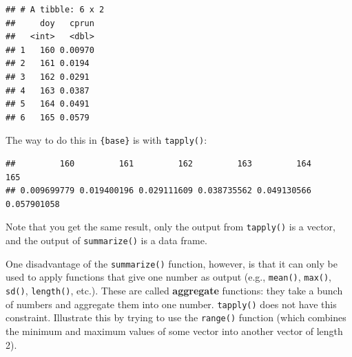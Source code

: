\documentclass[]{book}
\newenvironment{Shaded}{\begin{snugshade}}{\end{snugshade}}
\newcommand{\KeywordTok}[1]{\textcolor[rgb]{0.13,0.29,0.53}{\textbf{#1}}}
\newcommand{\DataTypeTok}[1]{\textcolor[rgb]{0.13,0.29,0.53}{#1}}
\newcommand{\DecValTok}[1]{\textcolor[rgb]{0.00,0.00,0.81}{#1}}
\newcommand{\StringTok}[1]{\textcolor[rgb]{0.31,0.60,0.02}{#1}}
\newcommand{\CommentTok}[1]{\textcolor[rgb]{0.56,0.35,0.01}{\textit{#1}}}
\newcommand{\OperatorTok}[1]{\textcolor[rgb]{0.81,0.36,0.00}{\textbf{#1}}}
\newcommand{\NormalTok}[1]{#1}
\theoremstyle{definition}
\theoremstyle{definition}
\theoremstyle{definition}
\theoremstyle{remark}
\begin{document}
\begin{Shaded}
\end{Shaded}

\begin{verbatim}
## # A tibble: 6 x 2
##     doy   cprun
##   <int>   <dbl>
## 1   160 0.00970
## 2   161 0.0194 
## 3   162 0.0291 
## 4   163 0.0387 
## 5   164 0.0491 
## 6   165 0.0579
\end{verbatim}

The way to do this in \texttt{\{base\}} is with \texttt{tapply()}:

\begin{Shaded}
\end{Shaded}

\begin{verbatim}
##         160         161         162         163         164         165 
## 0.009699779 0.019400196 0.029111609 0.038735562 0.049130566 0.057901058
\end{verbatim}

Note that you get the same result, only the output from
\texttt{tapply()} is a vector, and the output of \texttt{summarize()} is
a data frame.

One disadvantage of the \texttt{summarize()} function, however, is that
it can only be used to apply functions that give one number as output
(e.g., \texttt{mean()}, \texttt{max()}, \texttt{sd()},
\texttt{length()}, etc.). These are called \textbf{aggregate} functions:
they take a bunch of numbers and aggregate them into one number.
\texttt{tapply()} does not have this constraint. Illustrate this by
trying to use the \texttt{range()} function (which combines the minimum
and maximum values of some vector into another vector of length 2).

\begin{Shaded}
\end{Shaded}
\end{document}
